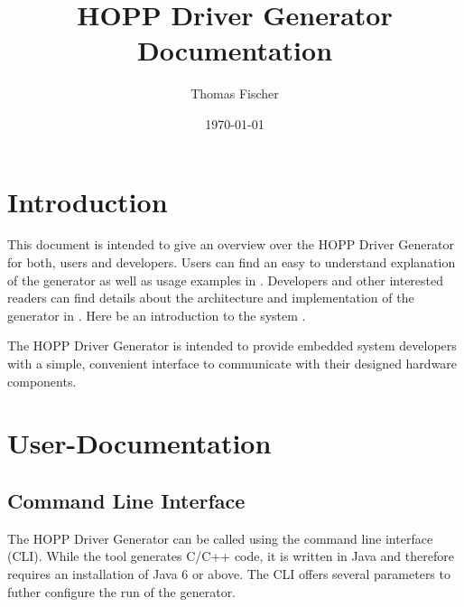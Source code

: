 \documentclass{report}
\begin{document}
\title{HOPP Driver Generator Documentation}
\author{Thomas Fischer}
\date{\today}

\maketitle
\thispagestyle{empty}
\newpage

\tableofcontents
\thispagestyle{empty}
\newpage

\chapter{Introduction}
This document is intended to give an overview over the HOPP Driver Generator for both, users and developers. Users can find an easy to understand explanation of the generator as well as usage examples in . Developers and other interested readers can find details about the architecture and implementation of the generator in .
Here be an introduction to the system \cite{fischer12}.

The HOPP Driver Generator is intended to provide embedded system developers %
with a simple, convenient interface to communicate with their designed hardware components. %

\chapter{User-Documentation}
\label{sec:userDoc}


\section{Command Line Interface}
The HOPP Driver Generator can be called using the command line interface (CLI). While the tool generates C/C++ code, it is written in Java and therefore requires an installation of Java 6 or above. The CLI offers several parameters to futher configure the run of the generator.
\end{document}
